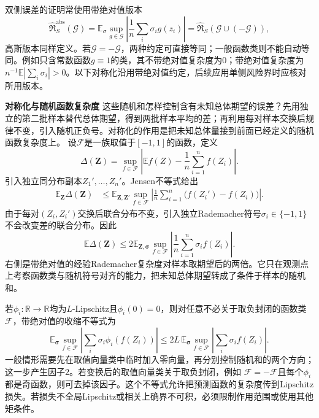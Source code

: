 双侧误差的证明常使用带绝对值版本
\[
  \widehat{\mathfrak R}^{\mathrm{abs}}_S(\mathcal G)
  =\mathbb E_\sigma\sup_{g\in\mathcal G}\left|\frac1n\sum_i\sigma_i g(z_i)\right|
  =\widehat{\mathfrak R}_S(\mathcal G\cup(-\mathcal G)),
\]
高斯版本同样定义。若\(\mathcal G=-\mathcal G\)，两种约定可直接等同；一般函数类则不能自动等同。例如只含常数函数\(g\equiv1\)的类，其不带绝对值复杂度为\(0\)；带绝对值复杂度为\(n^{-1}\mathbb E|\sum_i\sigma_i|>0\)。以下对称化沿用带绝对值约定，后续应用单侧风险界时应核对所用版本。

\par\medskip\noindent\textbf{对称化与随机函数复杂度}\quad
这些随机和怎样控制含有未知总体期望的误差？先用独立的第二批样本替代总体期望，得到两批样本平均的差；再利用每对样本交换后规律不变，引入随机正负号。对称化的作用是把未知总体量接到前面已经定义的随机函数复杂度上。
设\(\mathcal{F}\)是一族取值于\([-1,1]\)的函数，定义
\[ \Delta(\bm{Z})
  =\sup_{f\in\mathcal{F}}\left|\mathbb{E}f(Z)-\frac{1}{n}\sum_{i=1}^{n}f(Z_i)\right|. \]
引入独立同分布副本\(Z_1',\ldots,Z_n'\)。Jensen不等式给出
\[
\begin{aligned}
  \mathbb{E}_{\bm{Z}}\Delta(\bm{Z})
  &\leq
  \mathbb{E}_{\bm{Z},\bm{Z}'}
  \sup_{f\in\mathcal{F}}
  \left|
    \frac{1}{n}\sum_{i=1}^{n}
    \bigl(f(Z_i')-f(Z_i)\bigr)
  \right|.
\end{aligned}
\]
由于每对\((Z_i,Z_i')\)交换后联合分布不变，引入独立Rademacher符号\(\sigma_i\in\{-1,1\}\)不会改变差的联合分布。因此
\[
  \mathbb{E}\Delta(\bm{Z})
  \leq
  2\mathbb{E}_{\bm{Z},\bm{\sigma}}
  \sup_{f\in\mathcal{F}}
  \left|
    \frac{1}{n}\sum_{i=1}^{n}\sigma_i f(Z_i)
  \right|.
\]
右侧是带绝对值的经验Rademacher复杂度对样本取期望后的两倍。它只在观测点上考察函数类与随机符号对齐的能力，把未知总体期望转成了条件于样本的随机和。

若\(\phi_i:\mathbb{R}\to\mathbb{R}\)均为\(L\)-Lipschitz且\(\phi_i(0)=0\)，则对任意不必关于取负封闭的函数类\(\mathcal{F}\)，带绝对值的收缩不等式为
\[
  \mathbb{E}_{\bm{\sigma}}
  \sup_{f\in\mathcal{F}}
  \left|
    \sum_i\sigma_i\phi_i(f(Z_i))
  \right|
  \leq
  2L\,
  \mathbb{E}_{\bm{\sigma}}
  \sup_{f\in\mathcal{F}}
  \left|
    \sum_i\sigma_i f(Z_i)
  \right|.
\]
一般情形需要先在取值向量类中临时加入零向量，再分别控制随机和的两个方向；这一步产生因子\(2\)。若变换后的取值向量类关于取负封闭，例如
\(\mathcal{F}=-\mathcal{F}\)且每个\(\phi_i\)都是奇函数，则可去掉该因子。这个不等式允许把预测函数的复杂度传到Lipschitz损失。若损失不全局Lipschitz或相关上确界不可积，必须限制作用范围或使用其他矩条件。

